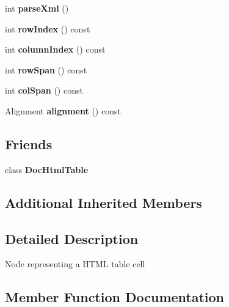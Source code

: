 \begin{DoxyCompactItemize}
int {\bfseries parse\+Xml} ()
\item 
\mbox{\label{class_doc_html_cell_a1291a4d81d1718d331d53f227244f2fa}} 
int {\bfseries row\+Index} () const
\item 
\mbox{\label{class_doc_html_cell_a02b389824b42f748e1b40fae79e9b8fe}} 
int {\bfseries column\+Index} () const
\item 
\mbox{\label{class_doc_html_cell_ae7a8ffd8ca1446e08942a68b3d0ef52c}} 
int {\bfseries row\+Span} () const
\item 
\mbox{\label{class_doc_html_cell_a24da0ece61676c8b191ad61a5373bab5}} 
int {\bfseries col\+Span} () const
\item 
\mbox{\label{class_doc_html_cell_abe42707109ca3bbad6ad388f766d8218}} 
Alignment {\bfseries alignment} () const
\end{DoxyCompactItemize}
\subsection*{Friends}
\begin{DoxyCompactItemize}
\item 
\mbox{\label{class_doc_html_cell_a1f7413118a8c0d90c891a2695a7cb90d}} 
class {\bfseries Doc\+Html\+Table}
\end{DoxyCompactItemize}
\subsection*{Additional Inherited Members}


\subsection{Detailed Description}
Node representing a H\+T\+ML table cell 

\subsection{Member Function Documentation}
\mbox{\label{class_doc_html_cell_a344128532d6fb2eed59389c843b3d473}} 
